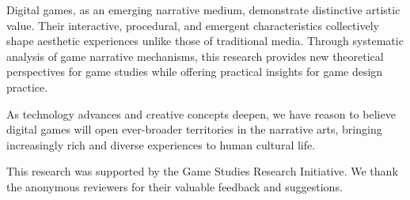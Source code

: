 \documentclass[red,fullpaper]{ludusofficial}  %
\begin{document}
Digital games, as an emerging narrative medium, demonstrate distinctive artistic value. Their interactive, procedural, and emergent characteristics collectively shape aesthetic experiences unlike those of traditional media. Through systematic analysis of game narrative mechanisms, this research provides new theoretical perspectives for game studies while offering practical insights for game design practice.

As technology advances and creative concepts deepen, we have reason to believe digital games will open ever-broader territories in the narrative arts, bringing increasingly rich and diverse experiences to human cultural life.

\begin{acknowledgments}
This research was supported by the Game Studies Research Initiative. We thank the anonymous reviewers for their valuable feedback and suggestions.
\end{acknowledgments}



\end{document}
